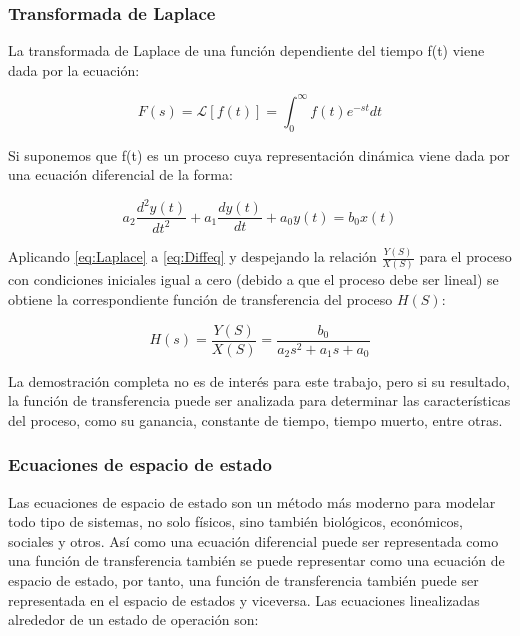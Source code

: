 		\subsubsection{Transformada de Laplace}
		
			La transformada de Laplace de una función dependiente del tiempo f(t) viene dada por la ecuación:
			
			\begin{equation}\label{eq:Laplace}
				F(s) = \mathcal{L}\left[f(t) \right] = \int_{0}^{\infty} f(t)e^{-st}dt
			\end{equation}
			
			Si suponemos que f(t) es un proceso cuya representación dinámica viene dada por una ecuación diferencial de la forma:
			
			\begin{equation}\label{eq:Diffeq}
				a_{2}\frac{d^{2}y(t)}{dt^{2}} + a_{1}\frac{dy(t)}{dt} + a_{0}y(t) = b_{0}x(t)
			\end{equation}
			
			Aplicando \cref{eq:Laplace} a \cref{eq:Diffeq}  y despejando la relación $\frac{Y(S)}{X(S)}$ para el proceso con condiciones iniciales igual a cero (debido a que el proceso debe ser lineal) se obtiene la correspondiente función de transferencia del proceso $H(S)$:
			
			 \begin{equation}\label{eq:TransferFunction}
			 H(s) =	\frac{Y(S)}{X(S)} = \frac{b_{0}}{a_{2}s^{2} + a_{1}s + a_{0}}
			 \end{equation}
			 
			 La demostración completa \Parencite[pp.$\,$21-22]{smith1985principles} no es de interés para este trabajo, pero si su resultado, la función de transferencia puede ser analizada para determinar las características del proceso, como su ganancia, constante de tiempo, tiempo muerto, entre otras.
			 
		 \subsubsection{Ecuaciones de espacio de estado}
		 
		 	Las ecuaciones de espacio de estado son un método más moderno para modelar todo tipo de sistemas, no solo físicos, sino también biológicos, económicos, sociales y otros. Así como una ecuación diferencial puede ser representada como una función de transferencia también se puede representar como una ecuación de espacio de estado, por tanto, una función de transferencia también puede ser representada en el espacio de estados y viceversa. Las ecuaciones linealizadas alrededor de un estado de operación \Parencite[p.$\,$31]{ogata2003ingenieria} son:
		 
